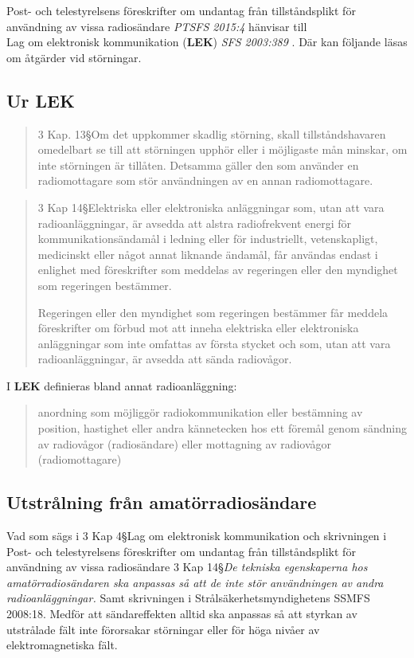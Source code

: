 Post- och telestyrelsens föreskrifter om undantag från tillståndsplikt för
användning av vissa radiosändare \emph{PTSFS 2015:4} \cite{PTSFS2015:4} hänvisar
till\\
Lag om elektronisk kommunikation (\textbf{LEK}) \emph{SFS 2003:389}
\cite{SFS2003:389}.
Där kan följande läsas om åtgärder vid störningar.

\subsection{Ur LEK}

\begin{quote}
3 Kap. 13\S Om det uppkommer skadlig störning, skall tillståndshavaren
omedelbart se till att störningen upphör eller i möjligaste mån minskar, om
inte störningen är tillåten.
Detsamma gäller den som använder en radiomottagare som stör användningen av en
annan radiomottagare.
\end{quote}

\begin{quote}
3 Kap 14\S Elektriska eller elektroniska anläggningar som, utan att vara
radioanläggningar, är avsedda att alstra radiofrekvent energi för
kommunikationsändamål i ledning eller för industriellt, vetenskapligt,
medicinskt eller något annat liknande ändamål, får användas endast i enlighet
med föreskrifter som meddelas av regeringen eller den myndighet som regeringen
bestämmer.

Regeringen eller den myndighet som regeringen bestämmer får meddela
föreskrifter om förbud mot att inneha elektriska eller elektroniska
anläggningar som inte omfattas av första stycket och som, utan att vara
radioanläggningar, är avsedda att sända radiovågor.
\end{quote}

I \textbf{LEK} definieras bland annat radioanläggning:
\begin{quote}
anordning som möjliggör radiokommunikation eller bestämning av position,
hastighet eller andra kännetecken hos ett föremål genom sändning av radiovågor
(radiosändare) eller mottagning av radiovågor (radiomottagare)
\end{quote}

\subsection{Utstrålning från amatörradiosändare}

Vad som sägs i 3 Kap 4\S Lag om elektronisk kommunikation och skrivningen i
Post- och telestyrelsens föreskrifter om undantag från tillståndsplikt för
användning av vissa radiosändare 3 Kap 14\S \emph{De tekniska egenskaperna hos
amatörradiosändaren ska anpassas så att de inte stör användningen av andra
radioanläggningar.}
Samt skrivningen i Strålsäkerhetsmyndighetens SSMFS 2008:18.
Medför att sändareffekten alltid ska anpassas så att styrkan av utstrålade
fält inte förorsakar störningar eller för höga nivåer av elektromagnetiska fält.

